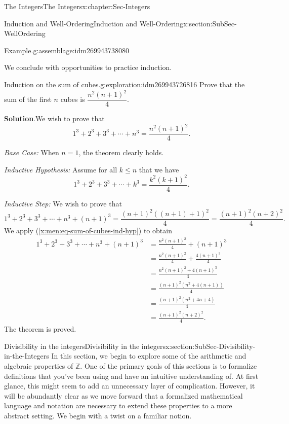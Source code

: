 \documentclass[oneside,10pt,]{book}
\numberwithin{equation}{section}
\renewcommand{\le}{\leqslant}
\def\Z{{\mathbb Z}}
\newcommand{\amp}{&}
\begin{document}
\begin{chapterptx}{The Integers}{}{The Integers}{}{}{x:chapter:Sec-Integers}
\begin{sectionptx}{Induction and Well-Ordering}{}{Induction and Well-Ordering}{}{}{x:section:SubSec-WellOrdering}
\begin{assemblage}{Example.}{g:assemblage:idm269943738080}
\end{assemblage}
We conclude with opportunities to practice induction.%
\begin{exploration}{Induction on the sum of cubes.}{g:exploration:idm269943726816}%
Prove that the sum of the first \(n\) cubes is \(\dfrac{n^2(n+1)^2}{4}\).%
\par\smallskip%
\noindent\textbf{Solution}.\hypertarget{g:solution:idm269943724640}{}\quad{}We wish to prove that%
\begin{equation*}
1^3 + 2^3 + 3^3 + \cdots + n^3 = \frac{n^2(n+1)^2}{4}.
\end{equation*}
%
\par
\emph{Base Case:} When \(n=1\), the theorem clearly holds.%
\par
\emph{Inductive Hypothesis:} Assume for all \(k\le n\) that we have%
\begin{equation}
1^3 + 2^3 + 3^3 + \cdots + k^3 = \frac{k^2(k+1)^2}{4}.\label{x:men:eq-sum-of-cubes-ind-hyp}
\end{equation}
%
\par
\emph{Inductive Step:} We wish to prove that%
\begin{equation*}
1^3 + 2^3 + 3^3 + \cdots + n^3 +(n+1)^3 = \frac{(n+1)^2((n+1)+1)^2}{4} = \frac{(n+1)^2(n+2)^2}{4}.
\end{equation*}
We apply \hyperref[x:men:eq-sum-of-cubes-ind-hyp]{(\ref{x:men:eq-sum-of-cubes-ind-hyp})} to obtain%
\begin{align*}
1^3 + 2^3 + 3^3 + \cdots + n^3 +(n+1)^3 \amp = \frac{n^2(n+1)^2}{4} + (n+1)^3 \\
\amp = \frac{n^2(n+1)^2}{4} + \frac{4(n+1)^3}{4}\\
\amp = \frac{n^2(n+1)^2 + 4(n+1)^3}{4}\\
\amp = \frac{(n+1)^2 (n^2+4(n+1))}{4}\\
\amp = \frac{(n+1)^2 (n^2+4n+4)}{4}\\
\amp = \frac{(n+1)^2 (n+2)^2}{4}.
\end{align*}
The theorem is proved.%
\end{exploration}
\end{sectionptx}
%
%
\typeout{************************************************}
\typeout{************************************************}
%
\begin{sectionptx}{Divisibility in the integers}{}{Divisibility in the integers}{}{}{x:section:SubSec-Divisibility-in-the-Integers}
In this section, we begin to explore some of the arithmetic and algebraic properties of \(\Z\). One of the primary goals of this sections is to formalize definitions that you've been using and have an intuitive understanding of. At first glance, this might seem to add an unnecessary layer of complication. However, it will be abundantly clear as we move forward that a formalized mathematical language and notation are necessary to extend these properties to a more abstract setting. We begin with a twist on a familiar notion.%

\end{sectionptx}
\end{chapterptx}
\end{document}
